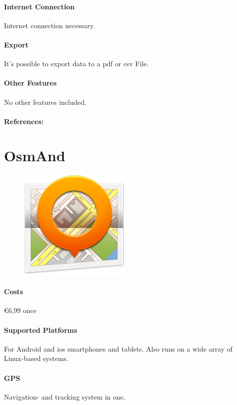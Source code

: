 \paragraph{Internet Connection} Internet connection necessary.
\paragraph{Export} It’s possible to export data to a \gls{pdf} or \gls{csv} File.
\paragraph{Other Features} No other features included.
\paragraph{References:} \cite{miles}
\newpage

\section{OsmAnd} 
\begin{figure}
  \begin{center}
    \includegraphics[width=0.48\textwidth]{bilder/osmand}
  \end{center}
\end{figure} 
\paragraph{Costs} \euro 6,99 once
\paragraph{Supported Platforms} For Android and \gls{ios} smartphones and tablets. Also runs on a wide array of Linux-based systems.
\paragraph{GPS} Navigation- and tracking  system in one.
